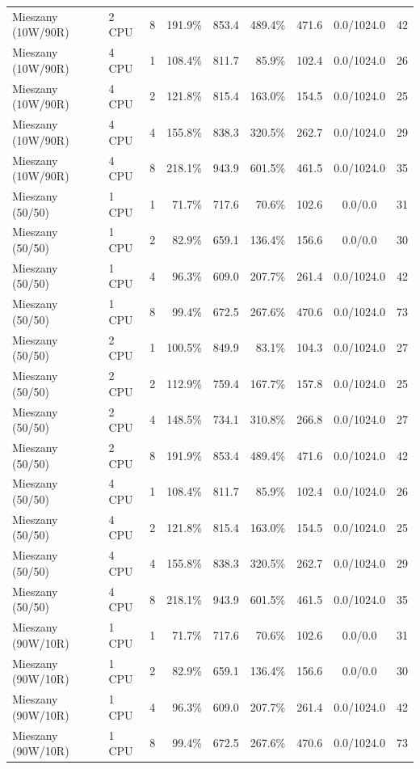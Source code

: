 \begin{table}[ht]
{\begin{tabular}{llcrrrrcc}
Mieszany (10W/90R) & 2 CPU & 8 & 191.9\% & 853.4 & 489.4\% & 471.6 & 0.0/1024.0 & 42 \\
Mieszany (10W/90R) & 4 CPU & 1 & 108.4\% & 811.7 & 85.9\% & 102.4 & 0.0/1024.0 & 26 \\
Mieszany (10W/90R) & 4 CPU & 2 & 121.8\% & 815.4 & 163.0\% & 154.5 & 0.0/1024.0 & 25 \\
Mieszany (10W/90R) & 4 CPU & 4 & 155.8\% & 838.3 & 320.5\% & 262.7 & 0.0/1024.0 & 29 \\
Mieszany (10W/90R) & 4 CPU & 8 & 218.1\% & 943.9 & 601.5\% & 461.5 & 0.0/1024.0 & 35 \\
Mieszany (50/50) & 1 CPU & 1 & 71.7\% & 717.6 & 70.6\% & 102.6 & 0.0/0.0 & 31 \\
Mieszany (50/50) & 1 CPU & 2 & 82.9\% & 659.1 & 136.4\% & 156.6 & 0.0/0.0 & 30 \\
Mieszany (50/50) & 1 CPU & 4 & 96.3\% & 609.0 & 207.7\% & 261.4 & 0.0/1024.0 & 42 \\
Mieszany (50/50) & 1 CPU & 8 & 99.4\% & 672.5 & 267.6\% & 470.6 & 0.0/1024.0 & 73 \\
Mieszany (50/50) & 2 CPU & 1 & 100.5\% & 849.9 & 83.1\% & 104.3 & 0.0/1024.0 & 27 \\
Mieszany (50/50) & 2 CPU & 2 & 112.9\% & 759.4 & 167.7\% & 157.8 & 0.0/1024.0 & 25 \\
Mieszany (50/50) & 2 CPU & 4 & 148.5\% & 734.1 & 310.8\% & 266.8 & 0.0/1024.0 & 27 \\
Mieszany (50/50) & 2 CPU & 8 & 191.9\% & 853.4 & 489.4\% & 471.6 & 0.0/1024.0 & 42 \\
Mieszany (50/50) & 4 CPU & 1 & 108.4\% & 811.7 & 85.9\% & 102.4 & 0.0/1024.0 & 26 \\
Mieszany (50/50) & 4 CPU & 2 & 121.8\% & 815.4 & 163.0\% & 154.5 & 0.0/1024.0 & 25 \\
Mieszany (50/50) & 4 CPU & 4 & 155.8\% & 838.3 & 320.5\% & 262.7 & 0.0/1024.0 & 29 \\
Mieszany (50/50) & 4 CPU & 8 & 218.1\% & 943.9 & 601.5\% & 461.5 & 0.0/1024.0 & 35 \\
Mieszany (90W/10R) & 1 CPU & 1 & 71.7\% & 717.6 & 70.6\% & 102.6 & 0.0/0.0 & 31 \\
Mieszany (90W/10R) & 1 CPU & 2 & 82.9\% & 659.1 & 136.4\% & 156.6 & 0.0/0.0 & 30 \\
Mieszany (90W/10R) & 1 CPU & 4 & 96.3\% & 609.0 & 207.7\% & 261.4 & 0.0/1024.0 & 42 \\
Mieszany (90W/10R) & 1 CPU & 8 & 99.4\% & 672.5 & 267.6\% & 470.6 & 0.0/1024.0 & 73 \\

\end{tabular}}
\end{table}
